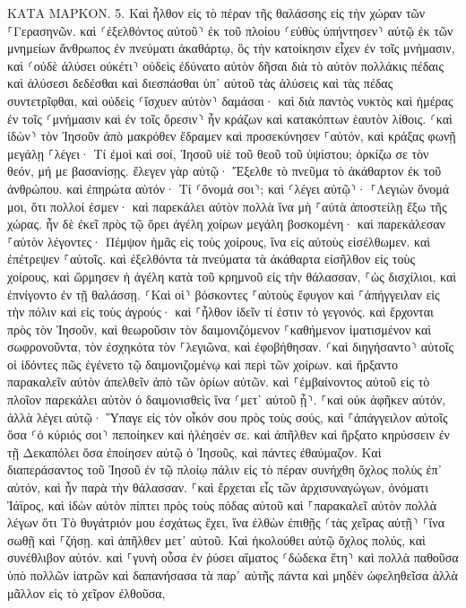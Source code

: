 \documentclass[twoside, 9pt]{extreport}
\begin{document}
ΚΑΤΑ ΜΑΡΚΟΝ.
5.
Καὶ ἦλθον εἰς τὸ πέραν τῆς θαλάσσης εἰς τὴν χώραν τῶν ⸀Γερασηνῶν. 
καὶ ⸂ἐξελθόντος αὐτοῦ⸃ ἐκ τοῦ πλοίου ⸂εὐθὺς ὑπήντησεν⸃ αὐτῷ ἐκ τῶν μνημείων ἄνθρωπος ἐν πνεύματι ἀκαθάρτῳ, 
ὃς τὴν κατοίκησιν εἶχεν ἐν τοῖς μνήμασιν, καὶ ⸂οὐδὲ ἁλύσει οὐκέτι⸃ οὐδεὶς ἐδύνατο αὐτὸν δῆσαι 
διὰ τὸ αὐτὸν πολλάκις πέδαις καὶ ἁλύσεσι δεδέσθαι καὶ διεσπάσθαι ὑπ᾽ αὐτοῦ τὰς ἁλύσεις καὶ τὰς πέδας συντετρῖφθαι, καὶ οὐδεὶς ⸂ἴσχυεν αὐτὸν⸃ δαμάσαι· 
καὶ διὰ παντὸς νυκτὸς καὶ ἡμέρας ἐν τοῖς ⸂μνήμασιν καὶ ἐν τοῖς ὄρεσιν⸃ ἦν κράζων καὶ κατακόπτων ἑαυτὸν λίθοις. 
⸂καὶ ἰδὼν⸃ τὸν Ἰησοῦν ἀπὸ μακρόθεν ἔδραμεν καὶ προσεκύνησεν ⸀αὐτόν, 
καὶ κράξας φωνῇ μεγάλῃ ⸀λέγει· Τί ἐμοὶ καὶ σοί, Ἰησοῦ υἱὲ τοῦ θεοῦ τοῦ ὑψίστου; ὁρκίζω σε τὸν θεόν, μή με βασανίσῃς. 
ἔλεγεν γὰρ αὐτῷ· Ἔξελθε τὸ πνεῦμα τὸ ἀκάθαρτον ἐκ τοῦ ἀνθρώπου. 
καὶ ἐπηρώτα αὐτόν· Τί ⸂ὄνομά σοι⸃; καὶ ⸂λέγει αὐτῷ⸃· ⸀Λεγιὼν ὄνομά μοι, ὅτι πολλοί ἐσμεν· 
καὶ παρεκάλει αὐτὸν πολλὰ ἵνα μὴ ⸀αὐτὰ ἀποστείλῃ ἔξω τῆς χώρας. 
ἦν δὲ ἐκεῖ πρὸς τῷ ὄρει ἀγέλη χοίρων μεγάλη βοσκομένη· 
καὶ παρεκάλεσαν ⸀αὐτὸν λέγοντες· Πέμψον ἡμᾶς εἰς τοὺς χοίρους, ἵνα εἰς αὐτοὺς εἰσέλθωμεν. 
καὶ ἐπέτρεψεν ⸀αὐτοῖς. καὶ ἐξελθόντα τὰ πνεύματα τὰ ἀκάθαρτα εἰσῆλθον εἰς τοὺς χοίρους, καὶ ὥρμησεν ἡ ἀγέλη κατὰ τοῦ κρημνοῦ εἰς τὴν θάλασσαν, ⸀ὡς δισχίλιοι, καὶ ἐπνίγοντο ἐν τῇ θαλάσσῃ. 
⸂Καὶ οἱ⸃ βόσκοντες ⸀αὐτοὺς ἔφυγον καὶ ⸀ἀπήγγειλαν εἰς τὴν πόλιν καὶ εἰς τοὺς ἀγρούς· καὶ ⸀ἦλθον ἰδεῖν τί ἐστιν τὸ γεγονός. 
καὶ ἔρχονται πρὸς τὸν Ἰησοῦν, καὶ θεωροῦσιν τὸν δαιμονιζόμενον ⸀καθήμενον ἱματισμένον καὶ σωφρονοῦντα, τὸν ἐσχηκότα τὸν ⸀λεγιῶνα, καὶ ἐφοβήθησαν. 
⸂καὶ διηγήσαντο⸃ αὐτοῖς οἱ ἰδόντες πῶς ἐγένετο τῷ δαιμονιζομένῳ καὶ περὶ τῶν χοίρων. 
καὶ ἤρξαντο παρακαλεῖν αὐτὸν ἀπελθεῖν ἀπὸ τῶν ὁρίων αὐτῶν. 
καὶ ⸀ἐμβαίνοντος αὐτοῦ εἰς τὸ πλοῖον παρεκάλει αὐτὸν ὁ δαιμονισθεὶς ἵνα ⸂μετ᾽ αὐτοῦ ᾖ⸃. 
⸀καὶ οὐκ ἀφῆκεν αὐτόν, ἀλλὰ λέγει αὐτῷ· Ὕπαγε εἰς τὸν οἶκόν σου πρὸς τοὺς σούς, καὶ ⸀ἀπάγγειλον αὐτοῖς ὅσα ⸂ὁ κύριός σοι⸃ πεποίηκεν καὶ ἠλέησέν σε. 
καὶ ἀπῆλθεν καὶ ἤρξατο κηρύσσειν ἐν τῇ Δεκαπόλει ὅσα ἐποίησεν αὐτῷ ὁ Ἰησοῦς, καὶ πάντες ἐθαύμαζον. 
Καὶ διαπεράσαντος τοῦ Ἰησοῦ ἐν τῷ πλοίῳ πάλιν εἰς τὸ πέραν συνήχθη ὄχλος πολὺς ἐπ᾽ αὐτόν, καὶ ἦν παρὰ τὴν θάλασσαν. 
⸀καὶ ἔρχεται εἷς τῶν ἀρχισυναγώγων, ὀνόματι Ἰάϊρος, καὶ ἰδὼν αὐτὸν πίπτει πρὸς τοὺς πόδας αὐτοῦ 
καὶ ⸀παρακαλεῖ αὐτὸν πολλὰ λέγων ὅτι Τὸ θυγάτριόν μου ἐσχάτως ἔχει, ἵνα ἐλθὼν ἐπιθῇς ⸂τὰς χεῖρας αὐτῇ⸃ ⸀ἵνα σωθῇ καὶ ⸀ζήσῃ. 
καὶ ἀπῆλθεν μετ᾽ αὐτοῦ. Καὶ ἠκολούθει αὐτῷ ὄχλος πολύς, καὶ συνέθλιβον αὐτόν. 
καὶ ⸀γυνὴ οὖσα ἐν ῥύσει αἵματος ⸂δώδεκα ἔτη⸃ 
καὶ πολλὰ παθοῦσα ὑπὸ πολλῶν ἰατρῶν καὶ δαπανήσασα τὰ παρ᾽ αὐτῆς πάντα καὶ μηδὲν ὠφεληθεῖσα ἀλλὰ μᾶλλον εἰς τὸ χεῖρον ἐλθοῦσα, 
\end{document}
